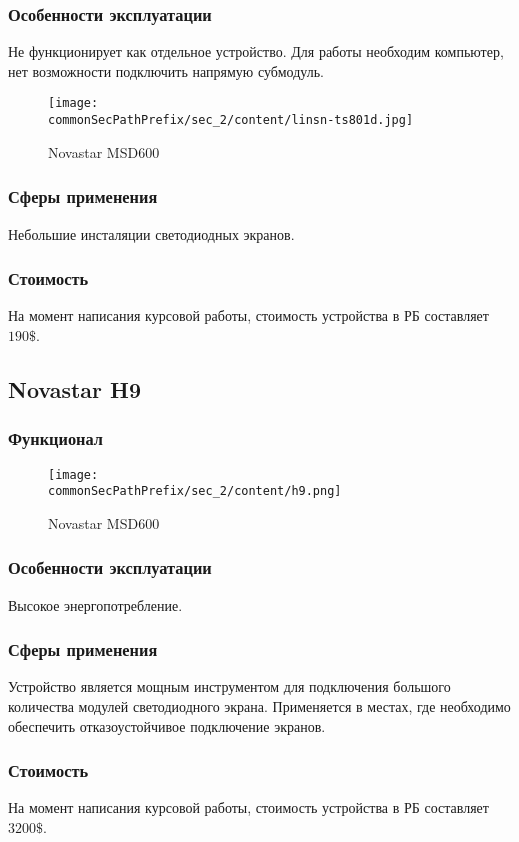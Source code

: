 \subsubsection{Особенности эксплуатации}
Не функционирует как отдельное устройство. Для работы необходим компьютер, нет возможности подключить напрямую субмодуль.
\begin{figure}[ht]
    \centering
    \texttt{[image: \\commonSecPathPrefix/sec\_2/content/linsn-ts801d.jpg]}
    \caption{Novastar MSD600}
\end{figure}
\subsubsection{Сферы применения}
Небольшие инсталяции светодиодных экранов.
\subsubsection{Стоимость}
На момент написания курсовой работы, стоимость устройства в РБ составляет \(190\$\).

\subsection{Novastar H9}
\subsubsection{Функционал}
\begin{figure}[ht]
    \centering
    \texttt{[image: \\commonSecPathPrefix/sec\_2/content/h9.png]}
    \caption{Novastar MSD600}
\end{figure}
\subsubsection{Особенности эксплуатации}
Высокое энергопотребление.
\subsubsection{Сферы применения}
Устройство является мощным инструментом для подключения большого количества модулей светодиодного экрана. Применяется в местах, где необходимо обеспечить отказоустойчивое подключение экранов.
\subsubsection{Стоимость}
На момент написания курсовой работы, стоимость устройства в РБ составляет \(3200\$\).
